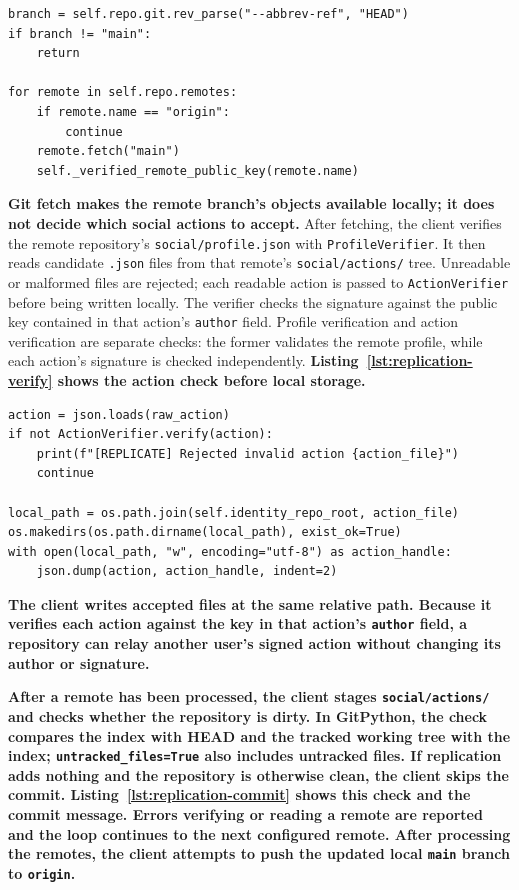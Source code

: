 \begin{lstlisting}[caption={Selecting replication sources and checking their profiles},label={lst:replication-sources}]
branch = self.repo.git.rev_parse("--abbrev-ref", "HEAD")
if branch != "main":
    return

for remote in self.repo.remotes:
    if remote.name == "origin":
        continue
    remote.fetch("main")
    self._verified_remote_public_key(remote.name)
\end{lstlisting}

\textbf{Git fetch makes the remote branch's objects available locally; it
does not decide which social actions to accept.} After fetching, the client
verifies the remote repository's
\texttt{social/profile.json} with \texttt{ProfileVerifier}. It then reads
candidate \texttt{.json} files from that remote's
\texttt{social/actions/} tree. Unreadable or malformed files are rejected;
each readable action is passed to \texttt{ActionVerifier} before being
written locally. The verifier checks the signature against the public key
contained in that action's \texttt{author} field. Profile verification and
action verification are separate checks: the former validates the remote
profile, while each action's signature is checked independently.
\textbf{Listing~\ref{lst:replication-verify} shows the action check before
local storage.}

\begin{lstlisting}[caption={Verifying candidate actions before local storage},label={lst:replication-verify}]
action = json.loads(raw_action)
if not ActionVerifier.verify(action):
    print(f"[REPLICATE] Rejected invalid action {action_file}")
    continue

local_path = os.path.join(self.identity_repo_root, action_file)
os.makedirs(os.path.dirname(local_path), exist_ok=True)
with open(local_path, "w", encoding="utf-8") as action_handle:
    json.dump(action, action_handle, indent=2)
\end{lstlisting}

\textbf{The client writes accepted files at the same relative path. Because
it verifies each action against the key in that action's \texttt{author}
field, a repository can relay another user's signed action without changing
its author or signature.}

\textbf{After a remote has been processed, the client stages
\texttt{social/actions/} and checks whether the repository is dirty. In
GitPython, the check compares the index with HEAD and the tracked working tree
with the index;
\texttt{untracked\_files=True} also includes untracked files. If replication
adds nothing and the repository is otherwise clean, the client skips the
commit. Listing~\ref{lst:replication-commit} shows this check and the commit
message. Errors verifying or reading a remote are reported and the loop
continues to the next configured remote. After processing the remotes, the
client attempts to push the updated local \texttt{main} branch to
\texttt{origin}.}

